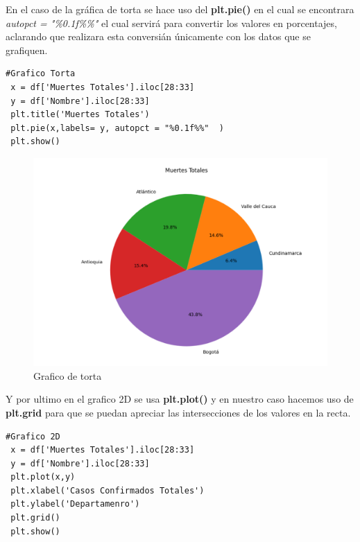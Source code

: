 \documentclass[conference,compsoc,onecolumn]{IEEEtran}
\begin{document}
En el caso de la gráfica de torta se hace uso del \textbf{plt.pie()} en el cual se encontrara \textit{autopct = "\%0.1f\%\%"}  el cual servirá para convertir los valores en porcentajes, aclarando que realizara esta conversián únicamente con los datos que se grafiquen.
\lstset{language=Python, breaklines=true, basicstyle=\footnotesize}
\lstset{numbers=left, numberstyle=\tiny, stepnumber=1, numbersep=-2pt}
\begin{lstlisting}[frame=single,caption={Código gráfica de torta },captionpos=b]
 #Grafico Torta 
 x = df['Muertes Totales'].iloc[28:33]
 y = df['Nombre'].iloc[28:33]
 plt.title('Muertes Totales')
 plt.pie(x,labels= y, autopct = "%0.1f%%"  )
 plt.show()
\end{lstlisting}
\label{cod}

\begin{figure}[H]
    \centering
    \includegraphics[keepaspectratio , scale = 0.3]{Grafica2.jpg}
    \caption{Grafico de torta}\label{GraficoTorta}
\end{figure}
Y por ultimo en el grafico 2D se usa \textbf{plt.plot()} y en nuestro caso hacemos uso de \textbf{plt.grid} para que se puedan apreciar las intersecciones de los valores en la recta.
\lstset{language=Python, breaklines=true, basicstyle=\footnotesize}
\lstset{numbers=left, numberstyle=\tiny, stepnumber=1, numbersep=-2pt}
\begin{lstlisting}[frame=single,caption={Código gráfica 2D },captionpos=b]
 #Grafico 2D
 x = df['Muertes Totales'].iloc[28:33]
 y = df['Nombre'].iloc[28:33]
 plt.plot(x,y)
 plt.xlabel('Casos Confirmados Totales')
 plt.ylabel('Departamenro')
 plt.grid()
 plt.show()
\end{lstlisting}
\label{cod}
\end{document}
